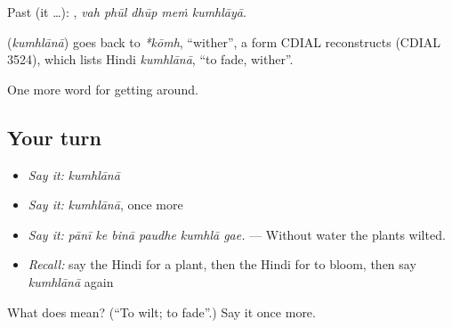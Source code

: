 Past (it …):     , \emph{vah phūl dhūp meṁ kumhlāyā}.

\begin{cousinweb}
\textbf{} (\emph{kumhlānā}) goes back to \emph{*kōmh}, \textquotedblleft{}wither\textquotedblright{}, a form CDIAL reconstructs (CDIAL 3524), which lists Hindi \emph{kumhlānā}, \textquotedblleft{}to fade, wither\textquotedblright{}.
\end{cousinweb}

\begin{grammarlens}[title={What you've built}]
One more word for getting around.
\end{grammarlens}

\subsection*{Your turn}
\begin{itemize}
\raggedright
  \item \emph{Say it:} \emph{kumhlānā}
  \item \emph{Say it:} \emph{kumhlānā}, once more
  \item \emph{Say it:} \emph{pānī ke binā paudhe kumhlā gae.} — Without water the plants wilted.
  \item \emph{Recall:} say the Hindi for a plant, then the Hindi for to bloom, then say \emph{kumhlānā} again
\end{itemize}

\begin{tcolorbox}[breakable,colback=teal!4,colframe=teal!35!black,title={Before you move on}]
What does  mean? (\textquotedblleft{}To wilt; to fade\textquotedblright{}.) Say it once more.
\end{tcolorbox}
